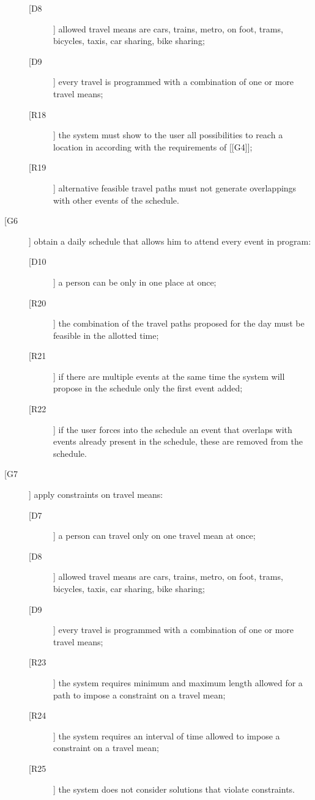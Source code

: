 \begin{description}
\begin{description}
	\item[[D8]] allowed travel means are cars, trains, metro, on foot, trams, bicycles, taxis, car sharing, bike sharing;
	\item[[D9]] every travel is programmed with a combination of one or more travel means;
	\newline
	\item[[R18]] the system must show to the user all possibilities to reach a location in according with the requirements of [[G4]];
	\item[[R19]] alternative feasible travel paths must not generate overlappings with other events of the schedule.
	\end{description}
\item[[G6]] obtain a daily schedule that allows him to attend every event in program:
	\begin{description}
	\item[[D10]] a person can be only in one place at once;
	\newline
	\item[[R20]] the combination of the travel paths proposed for the day must be feasible in the allotted time;
	\item[[R21]] if there are multiple events at the same time the system will propose in the schedule only the first event added;
	\item[[R22]] if the user forces into the schedule an event that overlaps with events already present in the schedule, these are removed from the schedule.
	\end{description}
\item[[G7]] apply constraints on travel means:
	\begin{description}
	\item[[D7]] a person can travel only on one travel mean at once; 
	\item[[D8]] allowed travel means are cars, trains, metro, on foot, trams, bicycles, taxis, car sharing, bike sharing;	
	\item[[D9]] every travel is programmed with a combination of one or more travel means;
	\newline
	\item[[R23]] the system requires minimum and maximum length allowed for a path to impose a constraint on a travel mean;
	\item[[R24]] the system requires an interval of time allowed to impose a constraint on a travel mean;
	\item[[R25]] the system does not consider solutions that violate constraints.

\end{description}
\end{description}
